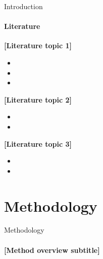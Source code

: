 \documentclass[t,pdf,aspectratio=169]{beamer}
\newcommand{\ph}[1]{[#1]}
\begin{document}
\begin{frame}{Introduction}
  \framesubtitle{Literature}
  \vfill

  \textcolor{PRIMARY}{\textbf{\ph{Literature topic 1}}}
  \scriptsize
  \begin{itemize}
    \item[-] \ph{Author(s) (Year, Journal) -- description}
    \item[-] \ph{Author(s) (Year, Journal) -- description}
    \item[-] \ph{Author(s) (Year, Journal) -- description}
  \end{itemize}
  \medskip

  \normalsize
  \textcolor{PRIMARY}{\textbf{\ph{Literature topic 2}}}
  \scriptsize
  \begin{itemize}
    \item[-] \ph{Author(s) (Year, Journal) -- description}
    \item[-] \ph{Author(s) (Year, Journal) -- description}
  \end{itemize}
  \medskip

  \normalsize
  \textcolor{PRIMARY}{\textbf{\ph{Literature topic 3}}}
  \scriptsize
  \begin{itemize}
    \item[-] \ph{Author(s) (Year, Journal) -- description}
    \item[-] \ph{Author(s) (Year, Journal) -- description}
  \end{itemize}

  \vfill
\end{frame}


\section{Methodology}

\begin{frame}
  \vfill
  \begin{center}
  \end{center}
  \vfill
\end{frame}

\begin{frame}{Methodology}
  \framesubtitle{\ph{Method overview subtitle}}
  \hypertarget{method-back}{}
  \begin{figure}[htb]
    \centering
  \end{figure}
  \vfill
\end{frame}
\end{document}
